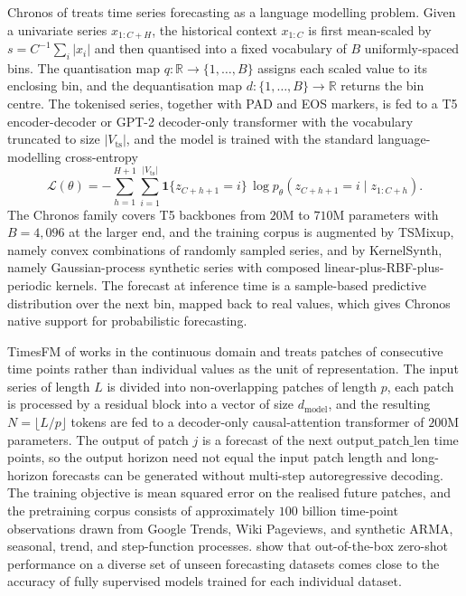 Chronos of \citet{Ansari2024} treats time series forecasting as a language
modelling problem. Given a univariate series $x_{1:C+H}$, the historical context
$x_{1:C}$ is first mean-scaled by $s = C^{-1} \sum_i |x_i|$ and then quantised
into a fixed vocabulary of $B$ uniformly-spaced bins. The quantisation map
$q : \mathbb R \to \{1, \dots, B\}$ assigns each scaled value to its enclosing
bin, and the dequantisation map $d : \{1, \dots, B\} \to \mathbb R$ returns the
bin centre. The tokenised series, together with PAD and EOS markers, is fed to
a T5 encoder-decoder or GPT-2 decoder-only transformer with the vocabulary
truncated to size $|V_{\mathrm{ts}}|$, and the model is trained with the standard
language-modelling cross-entropy
\begin{equation}
\mathcal L(\theta) = - \sum_{h=1}^{H+1} \sum_{i=1}^{|V_{\mathrm{ts}}|}
  \mathbf 1\{z_{C+h+1} = i\}\, \log p_\theta(z_{C+h+1} = i \mid z_{1:C+h}).
\label{eq:chronos_loss}
\end{equation}
The Chronos family covers T5 backbones from $20$M to $710$M parameters with
$B = 4{,}096$ at the larger end, and the training corpus is augmented by
TSMixup, namely convex combinations of randomly sampled series, and by
KernelSynth, namely Gaussian-process synthetic series with composed
linear-plus-RBF-plus-periodic kernels. The forecast at inference time is a
sample-based predictive distribution over the next bin, mapped back to real
values, which gives Chronos native support for probabilistic forecasting.

TimesFM of \citet{Das2024} works in the continuous domain and treats patches of
consecutive time points rather than individual values as the unit of
representation. The input series of length $L$ is divided into non-overlapping
patches of length $p$, each patch is processed by a residual block into a vector
of size $d_{\mathrm{model}}$, and the resulting $N = \lfloor L / p \rfloor$
tokens are fed to a decoder-only causal-attention transformer of $200$M
parameters. The output of patch $j$ is a forecast of the next
$\mathrm{output\_patch\_len}$ time points, so the output horizon need not equal
the input patch length and long-horizon forecasts can be generated without
multi-step autoregressive decoding. The training objective is mean squared error
on the realised future patches, and the pretraining corpus consists of
approximately $100$ billion time-point observations drawn from Google Trends,
Wiki Pageviews, and synthetic ARMA, seasonal, trend, and step-function
processes. \citet{Das2024} show that out-of-the-box zero-shot performance on a
diverse set of unseen forecasting datasets comes close to the accuracy of
fully supervised models trained for each individual dataset.

